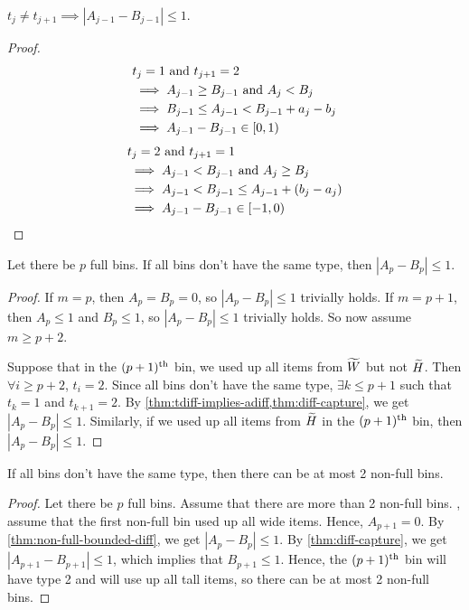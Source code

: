 \begin{lemma}
\label{thm:tdiff-implies-adiff}
$t_j \neq t_{j+1} \implies |A_{j-1} - B_{j-1}| \le 1$.
\end{lemma}
\begin{proof}
\begin{align*}
& t_j = 1 \textrm{ and } t_{j+1} = 2
\\ &\implies A_{j-1} \ge B_{j-1} \textrm{ and } A_j < B_j
\\ &\implies B_{j-1} \le A_{j-1} < B_{j-1} + a_j - b_j
\\ &\implies A_{j-1} - B_{j-1} \in [0, 1)
\end{align*}
\begin{align*}
& t_j = 2 \textrm{ and } t_{j+1} = 1
\\ &\implies A_{j-1} < B_{j-1} \textrm{ and } A_j \ge B_j
\\ &\implies A_{j-1} < B_{j-1} \le A_{j-1} + (b_j - a_j)
\\ &\implies A_{j-1} - B_{j-1} \in [-1, 0)
\qedhere \end{align*}
\end{proof}

\begin{lemma}
\label{thm:non-full-bounded-diff}
Let there be $p$ full bins. If all bins don't have the same type, then $|A_p - B_p| \le 1$.
\end{lemma}
\begin{proof}
If $m = p$, then $A_p = B_p = 0$, so $|A_p - B_p| \le 1$ trivially holds.
If $m = p+1$, then $A_p \le 1$ and $B_p \le 1$, so $|A_p - B_p| \le 1$ trivially holds.
So now assume $m \ge p+2$.

Suppose that in the $(p+1)^{\textrm{th}}$ bin, we used up all items from $\widetilde{W}$ but not $\widetilde{H}$.
Then $\forall i \ge p+2$, $t_i = 2$.
Since all bins don't have the same type, $\exists k \le p+1$ such that
$t_k = 1$ and $t_{k+1} = 2$.
By \cref{thm:tdiff-implies-adiff,thm:diff-capture}, we get $|A_p - B_p| \le 1$.
Similarly, if we used up all items from $\widetilde{H}$ in the $(p+1)^{\textrm{th}}$ bin, then $|A_p - B_p| \le 1$.
\end{proof}

\begin{lemma}
\label{thm:non-full-ub}
If all bins don't have the same type, then there can be at most 2 non-full bins.
\end{lemma}
\begin{proof}
Let there be $p$ full bins. Assume that there are more than 2 non-full bins.
\WLoG, assume that the first non-full bin used up all wide items.
Hence, $A_{p+1} = 0$.
By \cref{thm:non-full-bounded-diff}, we get $|A_p - B_p| \le 1$.
By \cref{thm:diff-capture}, we get $|A_{p+1} - B_{p+1}| \le 1$,
which implies that $B_{p+1} \le 1$.
Hence, the $(p+1)^{\textrm{th}}$ bin will have type 2 and will use up all tall items,
so there can be at most 2 non-full bins.
\end{proof}


